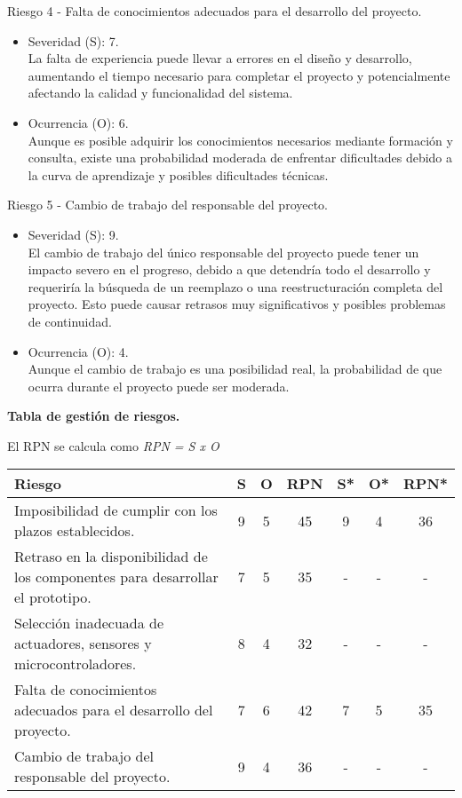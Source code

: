 Riesgo 4 - Falta de conocimientos adecuados para el desarrollo del proyecto.
\begin{itemize}
	\item Severidad (S): 7.\\ La falta de experiencia puede llevar a errores en el diseño
	      y desarrollo, aumentando el tiempo necesario para completar el proyecto y
	      potencialmente afectando la calidad y funcionalidad del sistema.
	\item Ocurrencia (O): 6.\\ Aunque es posible adquirir los conocimientos necesarios
	      mediante formación y consulta, existe una probabilidad moderada de enfrentar
	      dificultades debido a la curva de aprendizaje y posibles dificultades técnicas.
\end{itemize}

Riesgo 5 - Cambio de trabajo del responsable del proyecto.
\begin{itemize}
	\item Severidad (S): 9.\\ El cambio de trabajo del único responsable del proyecto
	      puede tener un impacto severo en el progreso, debido a que detendría todo el
	      desarrollo y requeriría la búsqueda de un reemplazo o una reestructuración
	      completa del proyecto. Esto puede causar retrasos muy significativos y posibles
	      problemas de continuidad.
	\item Ocurrencia (O): 4.\\ Aunque el cambio de trabajo es una posibilidad real, la
	      probabilidad de que ocurra durante el proyecto puede ser moderada.
\end{itemize}

\pagebreak

\textbf{Tabla de gestión de riesgos.}

El RPN se calcula como \textit{RPN = S x O}

\begin{table}[H]
	\centering
	\begin{tabularx}{\linewidth}{@{}|X|c|c|c|c|c|c|@{}}
		\hline
		\rowcolor[HTML]{C0C0C0}
		Riesgo                                                & S & O & RPN & S* & O* & RPN* \\ \hline
		Imposibilidad de cumplir con los plazos establecidos. & 9 & 5 & 45  & 9  & 4  & 36   \\ \hline
		Retraso en la disponibilidad de los componentes para
		desarrollar el prototipo.                             & 7 & 5 & 35  & -  & -  & -    \\ \hline
		Selección inadecuada de actuadores, sensores y
		microcontroladores.                                   & 8 & 4 & 32  & -  & -  & -    \\ \hline
		Falta de conocimientos adecuados para el desarrollo del
		proyecto.                                             & 7 & 6 & 42  & 7  & 5  & 35   \\ \hline
		Cambio de trabajo del responsable del proyecto.       & 9 & 4 & 36  & -  & -  & -    \\ \hline
	\end{tabularx}%
\end{table}

